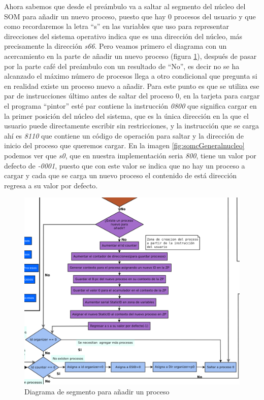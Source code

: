 \documentclass[letterpaper,12pt,oneside]{book}
\begin{document}
			
			Ahora sabemos que desde el preámbulo va a saltar al segmento del núcleo  del SOM para añadir un nuevo proceso, puesto
			que hay 0 procesos del usuario y que como recordaremos la letra ``s'' en las variables que uso para representar
			direcciones del sistema operativo  indica que es una dirección del núcleo, más precisamente la dirección \textit{s66}. Pero veamos
			primero el diagrama con un acercamiento en la parte de añadir un nuevo proceso (figura \ref{fig:diagAddnewprocess}), después
			de pasar por la parte café del preámbulo con un resultado de ``No'', es decir no se ha alcanzado el máximo número de procesos
			llega a otro condicional que pregunta si en realidad existe un proceso nuevo a añadir. Para este punto es que
			se utiliza ese par de instrucciones último antes de saltar del proceso 0, en la tarjeta para cargar el programa  ``pintor''
			esté par contiene la instrucción \textit{0800} que significa cargar en la primer posición del núcleo del sistema, que es la única
			dirección en la que el usuario puede directamente escribir sin restricciones, y la instrucción que se carga ahí es \textit{8110} que contiene
			un código de operación para saltar y la dirección de inicio del proceso que queremos cargar. En la imagen \ref{fig:somcGeneralnucleo}
			podemos ver que \textit{s0}, que en nuestra implementación seria \textit{800}, tiene un valor por defecto de \textit{-0001}, puesto que con este valor
			se indica que no hay un proceso a cargar y cada que se carga un nuevo proceso el contenido de está dirección regresa a su valor por defecto.
			

		\begin{figure}[h]		
			\centering
			\includegraphics[scale=0.4]{media/CARDIACC/DiagAddNewProcces.png}
			\caption{Diagrama de segmento para añadir un proceso}
			\label{fig:diagAddnewprocess}
		\end{figure}
\end{document}
